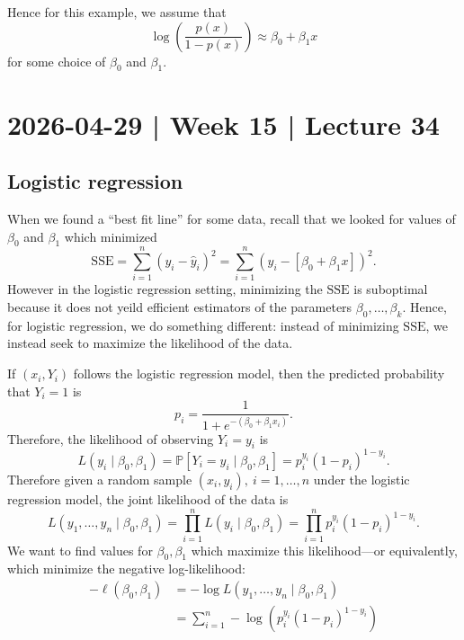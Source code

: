 \documentclass[10pt]{article}
\theoremstyle{definition}
\newcommand{\1}[1]{\textbf{1}_{\left[#1\right]}} %
\def\P{\mathbb{P}} %
\begin{document}
Hence for this example, we assume that 
\begin{equation}\label{eq:30}
  \log\left(\frac{p(x)}{1-p(x)} \right)  \approx \beta_{0}+\beta_{1}x
\end{equation}
for some choice of $\beta_{0}$ and $\beta_{1}$.

\newpage
\section{2026-04-29 | Week 15 | Lecture 34}
\subsection{Logistic regression}


When we found a ``best fit line'' for some data, recall that we looked for
values of $\beta_{0}$ and $\beta_{1}$ which minimized 
\begin{equation*}
  \mathrm{SSE} = \sum_{i=1}^{n} \left( y_{i}-\widehat{y}_{i} \right)^{2} = \sum_{i=1}^{n} \left( y_{i}- \left[ \beta_{0}+\beta_{1}x \right]  \right)^{2}.
\end{equation*}
However in the logistic regression setting, minimizing the $\mathrm{SSE}$ is
suboptimal because it does not yeild efficient estimators of the parameters
$\beta_{0},\ldots,\beta_{k}$. Hence, for logistic regression, we do something
different: instead of minimizing $\mathrm{SSE}$, we instead seek to maximize
the likelihood of the data.

If $(x_{i},Y_{i})$ follows the logistic regression model, then the predicted
probability that $Y_{i}=1$ is 
\begin{equation*}
  p_{i} = \frac{1}{1+e^{-(\beta_{0}+\beta_{1}x_{i})}}.
\end{equation*}
Therefore, the likelihood of observing $Y_{i}=y_{i}$ is
\begin{equation*}
  L(y_{i}\mid \beta_{0},\beta_{1}) = \P\left[Y_{i}=y_{i}\mid \beta_{0},\beta_{1} \right] = p_{i}^{y_{i}}(1-p_{i})^{1-y_{i}}.
\end{equation*}
Therefore given a random sample $(x_{i},y_{i}), \ i=1,\ldots,n$ under the
logistic regression model, the joint likelihood of the data is
\begin{equation*}
  L( y_{1},\ldots,y_{n}\mid \beta_{0},\beta_{1}) 
  = \prod_{i=1}^{n}  L(y_{i}\mid \beta_{0},\beta_{1}) = \prod_{i=1}^{n}p_{i}^{y_{i}}(1-p_{i})^{1-y_{i}}. 
\end{equation*}
We want to find values for $\beta_{0},\beta_{1}$ which maximize this
likelihood---or equivalently, which minimize the negative log-likelihood:
\begin{align*}
  -\ell(\beta_{0},\beta_{1}) 
  &= -\log L( y_{1},\ldots,y_{n}\mid \beta_{0},\beta_{1}) \\
  &= \sum_{i=1}^{n} - \log\left(p_{i}^{y_{i}}(1-p_{i})^{1-y_{i}}
    \right)
\end{align*}
\end{document}
